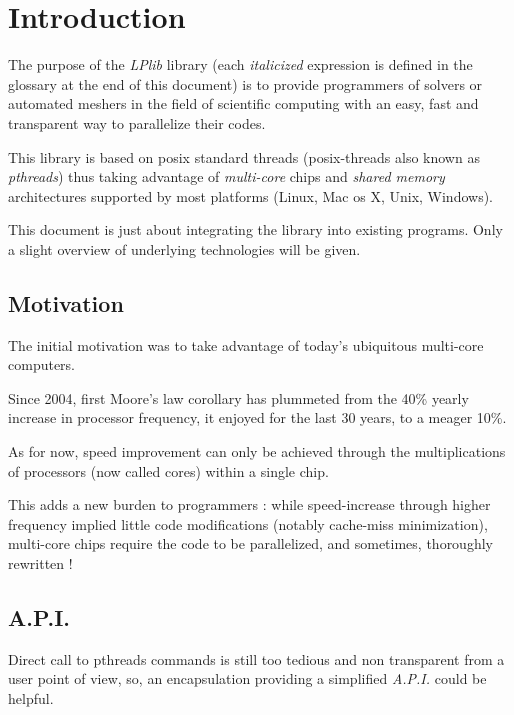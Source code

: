 \documentclass[a4paper,12pt]{article}
\begin{document}
\clearpage


%
%

\section{Introduction}

The purpose of the \emph{LPlib} library (each \emph{italicized} expression is defined in the glossary at the end of this document) is to provide programmers of solvers or automated meshers in the field of scientific computing with an easy, fast and transparent way to parallelize their codes.

This library is based on posix standard threads (posix-threads \cite{book_pthreads} also known as \emph{pthreads}) thus taking advantage of \emph{multi-core} chips and \emph{shared memory} architectures supported by most platforms (Linux, Mac os X, Unix, Windows).

This document is just about integrating the library into existing programs. Only a slight overview of underlying technologies will be given.

\subsection{Motivation}

The initial motivation was to take advantage of today's ubiquitous multi-core computers.

Since 2004, first Moore's law corollary has plummeted from the 40\% yearly increase in processor frequency, it enjoyed for the last 30 years, to a meager 10\%.

As for now, speed improvement can only be achieved through the multiplications of processors (now called cores) within a single chip.

This adds a new burden to programmers : while speed-increase through higher frequency implied little code modifications (notably cache-miss minimization), multi-core chips require the code to be parallelized, and sometimes, thoroughly rewritten !

\subsection{A.P.I.}

Direct call to pthreads commands is still too tedious and non transparent from a user point of view, so, an encapsulation providing a simplified \emph{A.P.I.} could be helpful.
\end{document}
